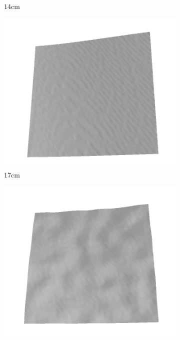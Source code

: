 \documentclass[../document.tex]{subfiles}
\begin{document}
\begin{figure}[htbp]
\begin{subfigure}[b]{0.19\textwidth}
    \caption{$14$cm}
    \end{subfigure}
    \begin{subfigure}[b]{0.19\textwidth}
    \includegraphics[width=\linewidth]{../img/5/train/all/17-patch-3d-majavi-12.png}
    \caption{$17$cm}
    \end{subfigure}
    \begin{subfigure}[b]{0.19\textwidth}
    \includegraphics[width=\linewidth]{../img/5/train/all/20-patch-3d-majavi-13.png}

\end{subfigure}
\end{figure}
\end{document}
